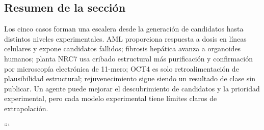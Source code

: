 \subsection{Resumen de la sección}

Los cinco casos forman una escalera desde la generación de candidatos hasta distintos niveles experimentales. AML proporciona respuesta a dosis en líneas celulares y expone candidatos fallidos; fibrosis hepática avanza a organoides humanos; planta NRC7 usa cribado estructural más purificación y confirmación por microscopía electrónica de 11-mero; OCT4 es solo retroalimentación de plausibilidad estructural; rejuvenecimiento sigue siendo un resultado de clase sin publicar. Un agente puede mejorar el descubrimiento de candidatos y la prioridad experimental, pero cada modelo experimental tiene límites claros de extrapolación.


```
